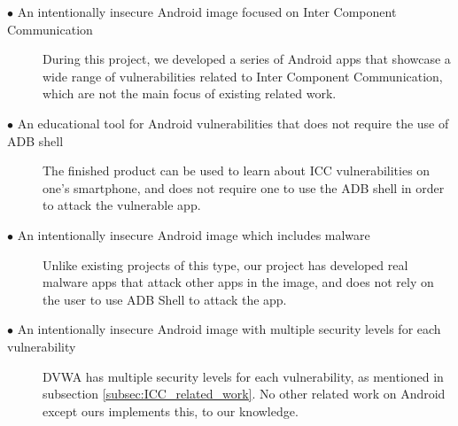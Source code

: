 		\begin{description}	
		
			\item[$\bullet$ An intentionally insecure Android image focused on Inter Component Communication]\hfill
			
			During this project, we developed a series of Android apps that showcase a wide range of vulnerabilities related to Inter Component Communication, which are not the main focus of existing related work. 
			
			\item[$\bullet$ An educational tool for Android vulnerabilities that does not require the use of ADB shell]\hfill
			
			The finished product can be used to learn about ICC vulnerabilities on one's smartphone, and does not require one to use the ADB shell in order to attack the vulnerable app.
			
			\item[$\bullet$ An intentionally insecure Android image which includes malware]\hfill
						
			Unlike existing projects of this type, our project has developed real malware apps that attack other apps in the image, and does not rely on the user to use ADB Shell to attack the app.
			
			\item[$\bullet$ An intentionally insecure Android image with multiple security levels for each vulnerability]\hfill
			
			DVWA has multiple security levels for each vulnerability, as mentioned in subsection \ref{subsec:ICC_related_work}. No other related work on Android except ours implements this, to our knowledge.
			
		\end{description}
